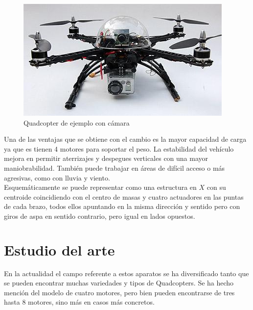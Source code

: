 \documentclass[twoside,11pt]{book}
\begin{document}
\begin{figure}[h!]
\begin{center}
\hspace{1cm}\includegraphics[scale=0.4,bb=0 0 405 205]{images/quadcopter_example.png}
\caption{Quadcopter de ejemplo con cámara}
\end{center}
\end{figure}


Una de las ventajas que se obtiene con el cambio es la mayor capacidad de carga ya que es tienen 4 motores  para soportar el peso. La estabilidad del vehículo mejora en permitir aterrizajes y despegues verticales con una mayor maniobrabilidad. También puede trabajar en áreas de difícil acceso o más agresivas, como con lluvia y viento. \\

Esquemáticamente se puede representar como una estructura en $X$ con su centroide coincidiendo con el centro de masas y cuatro actuadores en las puntas de cada brazo, todos ellos apuntando en la misma dirección y sentido pero con giros de aspa en sentido contrario, pero igual en lados opuestos.


\section{Estudio del arte}

En la actualidad el campo referente a estos aparatos se ha diversificado tanto que se pueden encontrar muchas variedades y tipos de Quadcopters. Se ha hecho mención del modelo de cuatro motores, pero bien pueden encontrarse de tres hasta 8 motores, sino más en casos más concretos. \\
\end{document}
